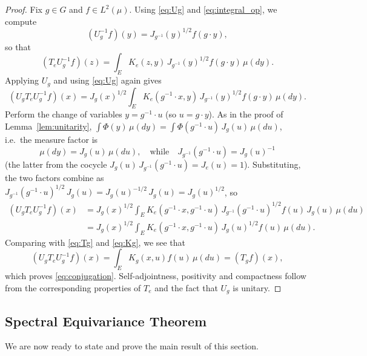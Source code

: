\documentclass[11pt,a4paper]{article}
\begin{document}
\begin{proof}
Fix $g \in G$ and $f \in L^2(\mu)$. Using \eqref{eq:Ug} and \eqref{eq:integral_op}, we compute
\[
(U_g^{-1} f)(y) = J_{g^{-1}}(y)^{1/2} f(g \cdot y),
\]
so that
\[
(T_e U_g^{-1} f)(z) = \int_E K_e(z, y) \, J_{g^{-1}}(y)^{1/2} f(g \cdot y) \, \mu(dy).
\]
Applying $U_g$ and using \eqref{eq:Ug} again gives
\[
(U_g T_e U_g^{-1} f)(x) = J_g(x)^{1/2} \int_E K_e(g^{-1} \cdot x, y) \, J_{g^{-1}}(y)^{1/2} f(g \cdot y) \, \mu(dy).
\]
Perform the change of variables $y = g^{-1} \cdot u$ (so $u = g \cdot y$). As in the proof of Lemma~\ref{lem:unitarity}, $\int \Phi(y)\,\mu(dy) = \int \Phi(g^{-1}\cdot u)\,J_g(u)\,\mu(du)$, i.e.\ the measure factor is
\[
\mu(dy) = J_g(u)\, \mu(du), \quad \text{while} \quad J_{g^{-1}}(g^{-1}\cdot u) = J_g(u)^{-1}
\]
(the latter from the cocycle $J_g(u)\,J_{g^{-1}}(g^{-1}\cdot u) = J_e(u) = 1$). Substituting, the two factors combine as $J_{g^{-1}}(g^{-1}\cdot u)^{1/2}\,J_g(u) = J_g(u)^{-1/2}\,J_g(u) = J_g(u)^{1/2}$, so
\begin{align*}
(U_g T_e U_g^{-1} f)(x) &= J_g(x)^{1/2} \int_E K_e(g^{-1} \cdot x, g^{-1} \cdot u) \, J_{g^{-1}}(g^{-1} \cdot u)^{1/2} f(u) \, J_g(u) \, \mu(du) \\
&= J_g(x)^{1/2} \int_E K_e(g^{-1} \cdot x, g^{-1} \cdot u) \, J_g(u)^{1/2} f(u) \, \mu(du).
\end{align*}
Comparing with \eqref{eq:Tg} and \eqref{eq:Kg}, we see that
\[
(U_g T_e U_g^{-1} f)(x) = \int_E K_g(x, u) f(u) \, \mu(du) = (T_g f)(x),
\]
which proves \eqref{eq:conjugation}. Self-adjointness, positivity and compactness follow from the corresponding properties of $T_e$ and the fact that $U_g$ is unitary.
\end{proof}

\subsection{Spectral Equivariance Theorem}

We are now ready to state and prove the main result of this section.
\end{document}
